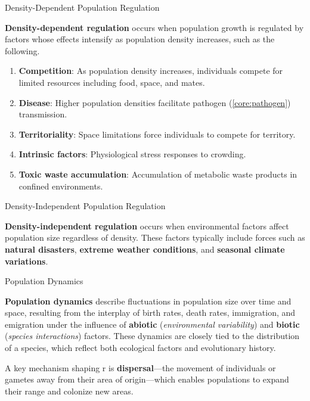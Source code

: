 \documentclass[10pt]{article}
\begin{document}
    \begin{core}{Density-Dependent Population Regulation}

      \textbf{Density-dependent regulation} occurs when population growth is regulated by factors whose effects intensify as population density increases, such as the following.

      \begin{enumerate}

        \item \textbf{Competition}: As population density increases, individuals compete for limited resources including food, space, and mates.

        \item \textbf{Disease}: Higher population densities facilitate pathogen (\autoref{core:pathogen}) transmission.

        \item \textbf{Territoriality}: Space limitations force individuals to compete for territory.

        \item \textbf{Intrinsic factors}: Physiological stress responses to crowding.

        \item \textbf{Toxic waste accumulation}: Accumulation of metabolic waste products in confined environments.

      \end{enumerate}

    \end{core}

    \begin{core}{Density-Independent Population Regulation}

      \textbf{Density-independent regulation} occurs when environmental factors affect population size regardless of density. These factors typically include forces such as \textbf{natural disasters}, \textbf{extreme weather conditions}, and \textbf{seasonal climate variations}.

    \end{core}

    \begin{core}{Population Dynamics}

      \textbf{Population dynamics} describe fluctuations in population size over time and space, resulting from the interplay of birth rates, death rates, immigration, and emigration under the influence of \textbf{abiotic} (\textit{environmental variability}) and \textbf{biotic} (\textit{species interactions}) factors. These dynamics are closely tied to the distribution of a species, which reflect both ecological factors and evolutionary history.

      A key mechanism shaping r is \textbf{dispersal}---the movement of individuals or gametes away from their area of origin---which enables populations to expand their range and colonize new areas.

    \end{core}
\end{document}
